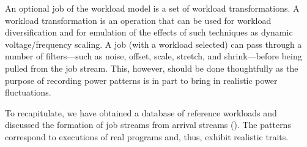 An optional job of the workload model is a set of workload transformations. A
workload transformation is an operation that can be used for workload
diversification and for emulation of the effects of such techniques as dynamic
voltage/frequency scaling. A job (with a workload selected) can pass through a
number of filters---such as noise, offset, scale, stretch, and shrink---before
being pulled from the job stream. This, however, should be done thoughtfully as
the purpose of recording power patterns is in part to bring in realistic power
fluctuations.

To recapitulate, we have obtained a database of reference workloads and
discussed the formation of job streams from arrival streams ().
The patterns correspond to executions of real programs and, thus, exhibit
realistic traits.
